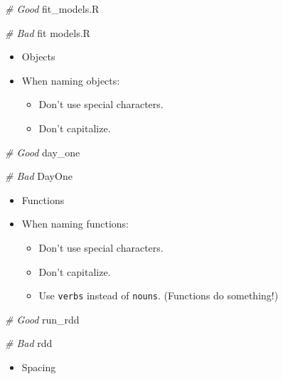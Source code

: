 \documentclass[
]{book}
\newenvironment{Shaded}{\begin{snugshade}}{\end{snugshade}}
\newcommand{\CommentTok}[1]{\textcolor[rgb]{0.56,0.35,0.01}{\textit{#1}}}
\newcommand{\NormalTok}[1]{#1}
\providecommand{\tightlist}{%
  \setlength{\itemsep}{0pt}\setlength{\parskip}{0pt}}
\begin{document}
\begin{Shaded}
\begin{Highlighting}[]
\CommentTok{\# Good}
\NormalTok{fit\_models.R}

\CommentTok{\# Bad}
\NormalTok{fit models.R}
\end{Highlighting}
\end{Shaded}

\begin{itemize}
\tightlist
\item
  Objects
\item
  When naming objects:

  \begin{itemize}
  \tightlist
  \item
    Don't use special characters.
  \item
    Don't capitalize.
  \end{itemize}
\end{itemize}

\begin{Shaded}
\begin{Highlighting}[]
\CommentTok{\# Good }
\NormalTok{day\_one}
    
\CommentTok{\# Bad }
\NormalTok{DayOne}
\end{Highlighting}
\end{Shaded}

\begin{itemize}
\tightlist
\item
  Functions
\item
  When naming functions:

  \begin{itemize}
  \tightlist
  \item
    Don't use special characters.
  \item
    Don't capitalize.
  \item
    Use \texttt{verbs} instead of \texttt{nouns}. (Functions do something!)
  \end{itemize}
\end{itemize}

\begin{Shaded}
\begin{Highlighting}[]
\CommentTok{\# Good }
\NormalTok{run\_rdd }

\CommentTok{\# Bad }
\NormalTok{rdd}
\end{Highlighting}
\end{Shaded}

\begin{itemize}
\tightlist
\item
  Spacing
\end{itemize}
\end{document}
